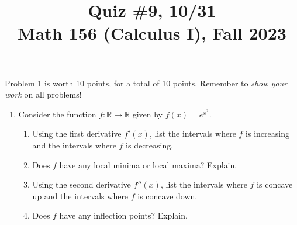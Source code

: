 \documentclass[11pt]{article}
\title{Quiz \#9, 10/31 \\ Math 156 (Calculus I), Fall 2023}
\date{}
\begin{document}
\maketitle

\thispagestyle{empty}

\vspace{-1cm}

Problem 1 is worth 10 points, for a total of 10 points. Remember to \emph{show your work} on all problems!

\begin{enumerate}
\item Consider the function $f\colon \mathbb{R} \to \mathbb{R}$ given by $f(x) = e^{x^2}$.
\begin{enumerate}
\item Using the first derivative $f'(x)$, list the intervals where $f$ is increasing and the intervals where $f$ is decreasing.
\item Does $f$ have any local minima or local maxima? Explain.
\item Using the second derivative $f''(x)$, list the intervals where $f$ is concave up and the intervals where $f$ is concave down.
\item Does $f$ have any inflection points? Explain.
\end{enumerate}

\end{enumerate}
\end{document}
